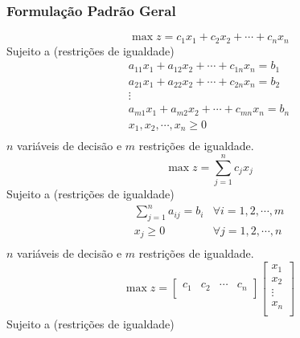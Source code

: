 \documentclass{beamer}
\begin{document}
\begin{frame}
	\frametitle{Formulação Padrão Geral} 
	\begin{mdframed}[backgroundcolor=blue!20] 
		{
			\begin{equation*}
				\max z = c_1x_1 + c_2x_2 + \cdots + c_nx_n 
			\end{equation*}
			{\color{red}Sujeito a (restrições de igualdade)} 
			\begin{equation*}
				\begin{matrix}
					a_{11}x_1 + a_{12}x_2 + \cdots + c_{1n}x_n = b_1 \\
					a_{21}x_1 + a_{22}x_2 + \cdots + c_{2n}x_n = b_2 \\
					\vdots \\
					a_{m1}x_1 + a_{m2}x_2 + \cdots + c_{mn}x_n = b_n \\
					x_1, x_2, \cdots, x_n \ge 0 \\
				\end{matrix}
			\end{equation*}
			$n$ variáveis de decisão e $m$ restrições de igualdade.
		}
		\only<2>
		{
			\begin{equation*}
				\max z = \sum_{j=1}^{n}c_jx_j
			\end{equation*}
			{\color{red}Sujeito a (restrições de igualdade)} 
			\begin{equation*}
				\begin{matrix}
					\sum_{j=1}^{n}a_{ij} = b_i & \forall i = 1, 2, \cdots, m \\
					x_j \ge 0 & \forall j = 1, 2, \cdots, n \\
				\end{matrix}
			\end{equation*}
			$n$ variáveis de decisão e $m$ restrições de igualdade.
		}
		\only<3>
		{
			\begin{equation*} 
				\max z = \begin{bmatrix}
							c_1 & c_2 & \cdots & c_n \\
						 \end{bmatrix}
						 \begin{bmatrix}
							 x_1 \\
							 x_2 \\
							 \vdots \\
							 x_n \\
						 \end{bmatrix}
			\end{equation*}
			{\color{red}Sujeito a (restrições de igualdade)} 
			\begin{equation*}

\end{equation*}}
\end{mdframed}
\end{frame}
\end{document}
